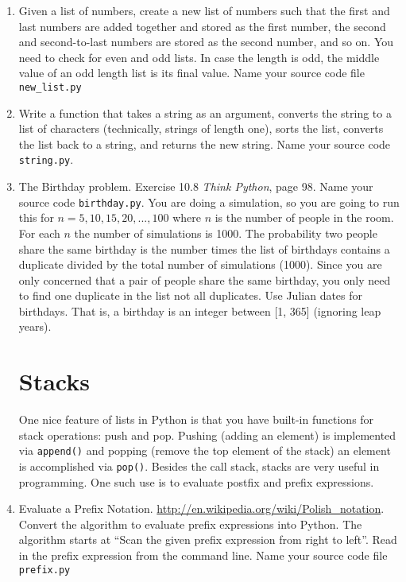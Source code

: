 \documentclass[12pt]{article}
\begin{document}
\begin{enumerate}
  [a, b, c, . . ., z] $\rightarrow$ [ [z], [y, z], [x, y, z], . . .,  [a, b, c, . . . , y, z] ]

Name your source code \texttt{list\_list.py}

\item Given a list of numbers, create a new list of numbers such that the first and last numbers are added together and stored as the first number, the second and second-to-last numbers are stored as the second number, and so on. You need to check for even and odd lists. In case the length is odd, the middle value of an odd length list is its final value. Name your source code file \texttt{new\_list.py}

\item Write a function that takes a string as an argument, converts the string to a list of characters (technically, strings of length one), sorts the list, converts the list back to a string, and returns the new string. Name your source code \texttt{string.py}. 

\item The Birthday problem. Exercise 10.8 \emph{Think Python}, page 98. Name your source code \texttt{birthday.py}. You are doing a simulation, so you are going to run this for $n = 5, 10, 15, 20, ..., 100$ where $n$ is the number of people in the room. For each $n$ the number of simulations is 1000. The probability two people share the same birthday is the number times the list of birthdays contains a duplicate divided by the total number of simulations (1000). Since you are only concerned that a pair of people share the same birthday, you only need to find one duplicate in the list not all duplicates. Use Julian dates for birthdays. That is, a birthday is an integer between [1, 365] (ignoring leap years).  

  \section*{Stacks}

  One nice feature of lists in Python is that you have built-in functions for stack operations: push and pop. Pushing (adding an element) is implemented via \texttt{append()} and popping (remove the top element of the stack) an element is accomplished via \texttt{pop()}. Besides the call stack, stacks are very useful in programming. One such use is to evaluate postfix and prefix expressions.

\item Evaluate a Prefix Notation. \url{http://en.wikipedia.org/wiki/Polish_notation}. Convert the algorithm to evaluate prefix expressions into Python. The algorithm starts at ``Scan the given prefix expression from right to left''. Read in the prefix expression from the command line. Name your source code file \texttt{prefix.py}


\end{enumerate}
\end{document}
